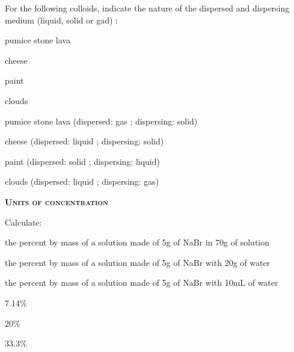 \documentclass[main.tex]{subfiles}
\begin{document}
\begin{multicols*}{2}
\begin{question}[ID=\the\value{numA}]
For the following colloids, indicate the nature of the dispersed and dispersing medium (liquid, solid or gad) : 
\begin{inparaenum}[(a)]	
\item  pumice stone lava %
\item  cheese  %
\item  paint  %
\item  clouds  %
 \end{inparaenum}
\end{question}
\begin{solution}
\begin{inparaenum}[(a)]
\item  pumice stone lava   (dispersed: gas ; dispersing: solid)
\item  cheese   (dispersed: liquid ; dispersing: solid)
\item  paint   (dispersed: solid ; dispersing: liquid)
\item  clouds   (dispersed: liquid ; dispersing: gas)
 \end{inparaenum}
\hspace{0.1cm}\end{solution}%

{\raggedright\textsc{\textbf{Units of concentration }}\par}




\begin{question}[ID=\the\value{numA}]
Calculate: 
\begin{inparaenum}[(a)]
\item  the percent by mass of a solution made of 5g of NaBr in 70g of solution %
\item  the percent by mass of a solution made of 5g of NaBr with 20g of water%
\item  the percent by mass of a solution made of 5g of NaBr with 10mL of water%
 \end{inparaenum}
\end{question}
\begin{solution}
\begin{inparaenum}[(a)]
\item   7.14\% 
\item   20\% 
\item   33.3\% 
 \end{inparaenum}\hspace{0.1cm}\end{solution}%


\end{multicols*}
\end{document}
